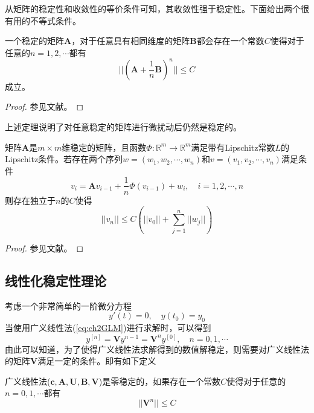 从矩阵的稳定性和收敛性的等价条件可知，其收敛性强于稳定性。下面给出两个很有用的不等式条件。%
\begin{theorem}[稳定矩阵的鲁棒性]
一个稳定的矩阵$\bm{A}$，对于任意具有相同维度的矩阵$\bm{B}$都会存在一个常数$C$使得对于任意的$n=1,2,\cdots$都有
\begin{equation}
||\left(\bm{A}+\frac{1}{n}\bm{B}\right)^n||\le C
\end{equation}
成立。
\end{theorem}%
\begin{proof}
参见文献。
\end{proof}
上述定理说明了对任意稳定的矩阵进行微扰动后仍然是稳定的。

\begin{theorem}
矩阵$\bm{A}$是$m\times m$维稳定的矩阵，且函数$\Phi:\mathbb{R}^{m}\to\mathbb{R}^{m}$满足带有Lipschitz常数$L$的Lipschitz条件。若存在两个序列$w=(w_1,w_2,\cdots,w_n)$和$v=(v_1,v_2,\cdots,v_n)$满足条件
\begin{equation}
v_i=\bm{A}v_{i-1}+\frac{1}{n}\Phi(v_{i-1})+w_i,\quad i=1,2,\cdots,n
\end{equation}
则存在独立于$n$的$C$使得
\begin{equation}
||v_n||\le C\left(||v_0||+\sum_{j=1}^{n}||w_j||\right)
\end{equation}
\end{theorem}%
\begin{proof}
参见文献。
\end{proof}
\subsection{线性化稳定性理论}
考虑一个非常简单的一阶微分方程
\begin{equation}
y'(t)=0,\quad y(t_0)=y_0
\end{equation}
当使用广义线性法(\ref{eq:ch2GLM})进行求解时，可以得到
\begin{equation}
y^{[n]}=\bm{V}y^{n-1}=\bm{V}^ny^{[0]},\quad n=0,1,\cdots
\end{equation}
由此可以知道，为了使得广义线性法求解得到的数值解稳定，则需要对广义线性法的矩阵$\bm{V}$满足一定的条件。即有如下定义
\begin{definition}[零稳定性]
广义线性法($\bm{c},\bm{A},\bm{U},\bm{B},\bm{V}$)是零稳定的\cite{Jackiewicz2009,Burrage1995,Butcher2008}，如果存在一个常数$C$使得对于任意的$n=0,1,\cdots$都有
\begin{equation}
||\bm{V}^n||\le C
\end{equation}
\end{definition}%

